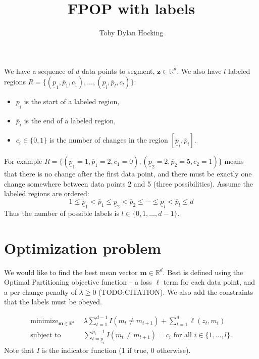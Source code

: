 \documentclass{article}
\DeclareMathOperator*{\minimize}{minimize}
\newcommand{\RR}{\mathbb R}
\begin{document}
\title{FPOP with labels}
\author{Toby Dylan Hocking}
\maketitle

We have a sequence of $d$ data points to segment,
$\mathbf z\in\mathbb R^d$. We also have $l$ labeled regions
$R=\{(\underline p_1, \overline p_1, c_1), \dots,
(\underline p_l, \overline p_l, c_l)\}$:
\begin{itemize}
\item $\underline p_i$ is the start of a labeled region,
\item $\overline p_i$ is the end of a labeled region,
\item $c_i\in\{0,1\}$ is the number of changes in the region
  $[\underline p_i, \overline p_i]$. 
\end{itemize}
For example
$R=\{(\underline p_1=1,\overline p_1=2,c_1=0),(\underline
p_2=2,\overline p_2=5,c_2=1)\}$ means that there is no change after
the first data point, and there must be exactly one change somewhere
between data points 2 and 5 (three possibilities). Assume the
labeled regions are ordered:
\begin{equation}
  \label{eq:sorted}
  1 \leq 
\underline p_1 < \overline p_1 \leq 
\underline p_2 < \overline p_2 \leq
\cdots \leq 
\underline p_l < \overline p_l \leq 
d
\end{equation}
Thus the number of possible labels is $l\in\{0, 1, \dots, d-1\}$.

\section{Optimization problem}

We would like to find the best mean vector $\mathbf m\in\mathbb R^d$.
Best is defined using the Optimal Partitioning objective function -- a
loss $\ell$ term for each data point, and a per-change penalty of
$\lambda\geq 0$ (TODO:CITATION). We also add the constraints that the
labels must be obeyed.

\begin{align}
\minimize_{
  \mathbf m\in\RR^{d}
  } &\ \ 
\lambda\sum_{t=1}^{d-1} I(m_t \neq m_{t+1})
+
\sum_{t=1}^d \ell(z_t, m_t) 
  \label{LabeledProb}
\\
    \text{subject to} 
& \ \ \sum_{t=\underline p_i}^{\overline p_i-1} I(m_t \neq m_{t+1})=c_i
\text{ for all } i\in\{1,\dots,l\}.
\end{align}
Note that $I$ is the indicator function (1 if true, 0 otherwise).
\end{document}
